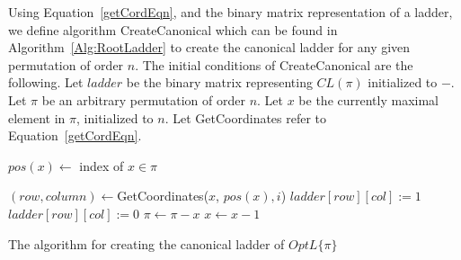 Using Equation~\ref{getCordEqn}, and the binary matrix representation 
of a ladder, we define algorithm {\sc CreateCanonical} which can be found 
in Algorithm~\ref{Alg:RootLadder} to create the canonical ladder for 
any given permutation of order $n$. 
The initial conditions of {\sc CreateCanonical} are the 
following. Let $ladder$ be the binary matrix representing $CL(\pi)$ initialized to $-$. Let $\pi$ be an arbitrary permutation 
of order $n$. Let $x$ be the currently maximal element in $\pi$, initialized to $n$. Let {\sc GetCoordinates} refer to 
Equation~\ref{getCordEqn}. 
\begin{algorithm}[ht]
	\begin{algorithmic}[1]
                \State $pos(x) \gets $ index of $x \in \pi$
                        
                        \State $(row, column) \gets${\sc GetCoordinates($x$, $pos(x), i$)}
                            \State $ladder[row][col]:=1$
                        \Else
                            \State $ladder[row][col]:=0$
                        \EndIf
                    \EndIf
                \EndFor
                \State $\pi \gets \pi - x$
                \State $x \gets x-1$
            \EndWhile
        \EndFunction

	\end{algorithmic}
	\caption{The algorithm for creating the canonical ladder of $OptL\{\pi\}$}
	\label{Alg:RootLadder}
\end{algorithm}

